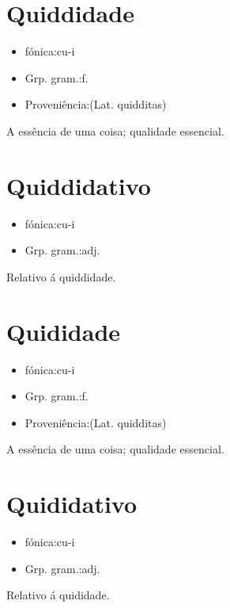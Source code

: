 \section{Quiddidade}
\begin{itemize}
\item {fónica:cu-i}
\end{itemize}
\begin{itemize}
\item {Grp. gram.:f.}
\end{itemize}
\begin{itemize}
\item {Proveniência:(Lat. \textunderscore quidditas\textunderscore )}
\end{itemize}
A essência de uma coisa; qualidade essencial.
\section{Quiddidativo}
\begin{itemize}
\item {fónica:cu-i}
\end{itemize}
\begin{itemize}
\item {Grp. gram.:adj.}
\end{itemize}
Relativo á quiddidade.
\section{Quididade}
\begin{itemize}
\item {fónica:cu-i}
\end{itemize}
\begin{itemize}
\item {Grp. gram.:f.}
\end{itemize}
\begin{itemize}
\item {Proveniência:(Lat. \textunderscore quidditas\textunderscore )}
\end{itemize}
A essência de uma coisa; qualidade essencial.
\section{Quididativo}
\begin{itemize}
\item {fónica:cu-i}
\end{itemize}
\begin{itemize}
\item {Grp. gram.:adj.}
\end{itemize}
Relativo á quididade.
